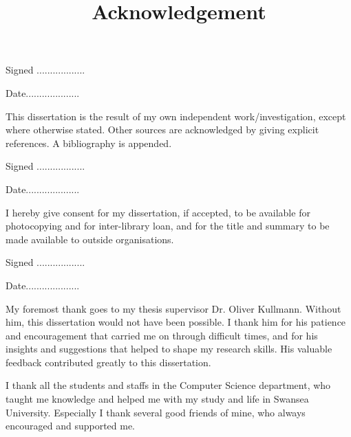 \documentclass[a4paper,12pt]{report}
\begin{document}
\begin{onehalfspacing}
\begin{flushleft}Signed ..................\end{flushleft} 
\begin{flushright}Date....................\end{flushright}                                                                                                                                              

This dissertation is the result of my own independent work/investigation, except where otherwise stated. Other sources are acknowledged by giving explicit references. A bibliography is appended.

\begin{flushleft}Signed ..................\end{flushleft} 
\begin{flushright}Date....................\end{flushright}                                                                                                                                              

I hereby give consent for my dissertation, if accepted, to be available for photocopying and for inter-library loan, and for the title and summary to be made available to outside organisations.

\begin{flushleft}Signed ..................\end{flushleft} 
\begin{flushright}Date....................\end{flushright}                                                                                                                                              
 \clearpage
\begin{center}
\title {Acknowledgement}
\end{center}
My foremost thank goes to my thesis supervisor Dr. Oliver Kullmann. Without him, this dissertation would not have been possible. I thank him for his patience and encouragement that carried me on through difficult times, and for his insights and suggestions that helped to shape my research skills. His valuable feedback contributed greatly to this dissertation.

I thank all the students and staffs in the Computer Science department, who taught me knowledge and helped me with my study and life in Swansea University. Especially I thank several good friends of mine, who always encouraged and supported me.


\end{onehalfspacing}
\end{document}
